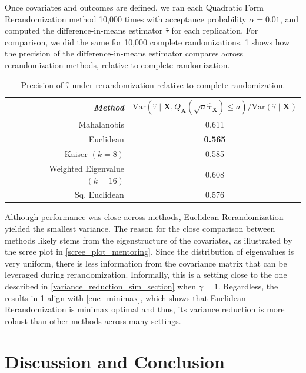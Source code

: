 \documentclass[11pt,twoside]{article}
\theoremstyle{definition}
\theoremstyle{remark}
\begin{document}
Once covariates and outcomes are defined, we ran each Quadratic Form Rerandomization method 10,000 times with acceptance probability $\alpha = 0.01$, and computed the difference-in-means estimator $\widehat{\tau}$ for each replication. For comparison, we did the same for 10,000 complete randomizations. \cref{real_data_table} shows how the precision of the difference-in-means estimator compares across rerandomization methods, relative to complete randomization. 

\begin{table}[h]
\centering
\begin{tabular}{r|c}
\textit{Method} & $\text{Var}(\widehat{\tau} \mid \mathbf{X}, Q_{\mathbf{A}}(\sqrt{n} \widehat{\bm{\tau}}_{\mathbf{X}}) \leq a) / \text{Var}(\widehat{\tau} \mid \mathbf{X})$\\ \hline
Mahalanobis & 0.611  \\
Euclidean & \textbf{0.565}   \\
Kaiser $(k = 8)$ & 0.585 \\
Weighted Eigenvalue $(k = 16)$ & 0.608  \\
Sq. Euclidean & 0.576
\end{tabular}
\caption{Precision of $\widehat{\tau}$ under rerandomization relative to complete randomization.}
\label{real_data_table}
\end{table} 


Although performance was close across methods, Euclidean Rerandomization yielded the smallest variance. The reason for the close comparison between methods likely stems from the eigenstructure of the covariates, as illustrated by the scree plot in \cref{scree_plot_mentoring}. Since the distribution of eigenvalues is very uniform, there is less information from the covariance matrix that can be leveraged during rerandomization. Informally, this is a setting close to the one described in \cref{variance_reduction_sim_section} when $\gamma = 1$. Regardless, the results in \cref{real_data_table} align with \cref{euc_minimax}, which shows that Euclidean Rerandomization is minimax optimal and thus, its variance reduction is more robust than other methods across many settings.






\section{Discussion and Conclusion} \label{conclusion}
\end{document}
